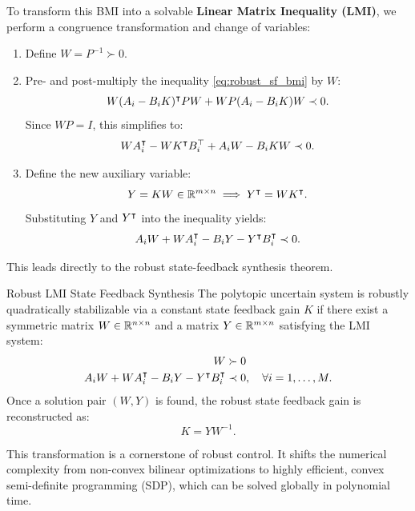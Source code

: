 To transform this BMI into a solvable \textbf{Linear Matrix Inequality (LMI)}, we perform a congruence transformation and change of variables:
\begin{enumerate}
    \item Define $W = P^{-1} \succ 0$.
    \item Pre- and post-multiply the inequality \eqref{eq:robust_sf_bmi} by $W$:
    \begin{equation}
W (A_i - B_i K)^\intercal P W + W P (A_i - B_i K) W \prec 0 .
    \end{equation}
    Since $WP = I$, this simplifies to:
    \begin{equation}
W A_i^\intercal - W K^\intercal B_i^\top + A_i W - B_i K W \prec 0 .
    \end{equation}
    \item Define the new auxiliary variable:
    \begin{equation}
Y = K W \in \mathbb{R}^{m \times n} \implies Y^\intercal = W K^\intercal .
    \end{equation}
    Substituting $Y$ and $Y^\intercal$ into the inequality yields:
    \begin{equation}
A_i W + W A_i^\intercal - B_i Y - Y^\intercal B_i^\intercal \prec 0 .
    \end{equation}
\end{enumerate}

This leads directly to the robust state-feedback synthesis theorem.

\begin{mytheorem}{Robust LMI State Feedback Synthesis}
The polytopic uncertain system is robustly quadratically stabilizable via a constant state feedback gain $K$ if there exist a symmetric matrix $W \in \mathbb{R}^{n \times n}$ and a matrix $Y \in \mathbb{R}^{m \times n}$ satisfying the LMI system:
\begin{align}
    W &\succ 0 \label{eq:lmi_w} \\
    A_i W + W A_i^\intercal - B_i Y - Y^\intercal B_i^\intercal &\prec 0, \quad \forall i = 1, \dots, M . \label{eq:lmi_vertex}
\end{align}
Once a solution pair $(W, Y)$ is found, the robust state feedback gain is reconstructed as:
\begin{equation}
    K = Y W^{-1} . \label{eq:lmi_k_reconstruct}
\end{equation}
\end{mytheorem}
This transformation is a cornerstone of robust control. It shifts the numerical complexity from non-convex bilinear optimizations to highly efficient, convex semi-definite programming (SDP), which can be solved globally in polynomial time.


